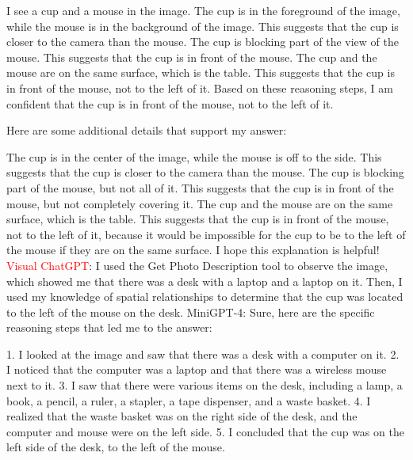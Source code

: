 \begin{enumerate}
    I see a cup and a mouse in the image.
    The cup is in the foreground of the image, while the mouse is in the background of the image. This suggests that the cup is closer to the camera than the mouse.
    The cup is blocking part of the view of the mouse. This suggests that the cup is in front of the mouse.
    The cup and the mouse are on the same surface, which is the table. This suggests that the cup is in front of the mouse, not to the left of it.
    Based on these reasoning steps, I am confident that the cup is in front of the mouse, not to the left of it.

    Here are some additional details that support my answer:

    The cup is in the center of the image, while the mouse is off to the side. This suggests that the cup is closer to the camera than the mouse.
    The cup is blocking part of the mouse, but not all of it. This suggests that the cup is in front of the mouse, but not completely covering it.
    The cup and the mouse are on the same surface, which is the table. This suggests that the cup is in front of the mouse, not to the left of it, because it would be impossible for the cup to be to the left of the mouse if they are on the same surface.
    I hope this explanation is helpful!
    \subitem \textcolor{red}{Visual ChatGPT}: I used the Get Photo Description tool to observe the image, which showed me that there was a desk with a laptop and a laptop on it. Then, I used my knowledge of spatial relationships to determine that the cup was located to the left of the mouse on the desk.
    \subitem MiniGPT-4: Sure, here are the specific reasoning steps that led me to the answer:

    1. I looked at the image and saw that there was a desk with a computer on it.
    2. I noticed that the computer was a laptop and that there was a wireless mouse next to it.
    3. I saw that there were various items on the desk, including a lamp, a book, a pencil, a ruler, a stapler, a tape dispenser, and a waste basket.
    4. I realized that the waste basket was on the right side of the desk, and the computer and mouse were on the left side.
    5. I concluded that the cup was on the left side of the desk, to the left of the mouse.
\end{enumerate}
